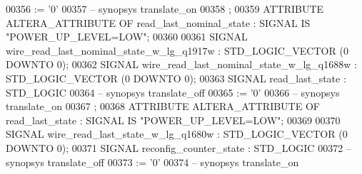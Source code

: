 \begin{DoxyCode}
{00356       \textcolor{vhdlchar}{:=} \textcolor{vhdlchar}{'}\textcolor{vhdllogic}{}\textcolor{vhdllogic}{0}\textcolor{vhdlchar}{'}
00357 \textcolor{keyword}{     -- synopsys translate\_on}
00358      ;
00359      \textcolor{keywordflow}{ATTRIBUTE} \textcolor{vhdlchar}{ALTERA_ATTRIBUTE} \textcolor{keywordflow}{OF} \textcolor{vhdlchar}{read_last_nominal_state} \textcolor{vhdlchar}{:} \textcolor{keywordflow}{SIGNAL} \textcolor{keywordflow}{IS} \textcolor{keyword}{"POWER\_UP\_LEVEL=LOW"};
00360 
00361      \textcolor{keywordflow}{SIGNAL}  \textcolor{vhdlchar}{wire_read_last_nominal_state_w_lg_q1917w}   \textcolor{vhdlchar}{:}   \textcolor{comment}{STD\_LOGIC\_VECTOR} \textcolor{vhdlchar}{(}\textcolor{vhdllogic}{}\textcolor{vhdllogic}{0} \textcolor{keywordflow}{DOWNTO} \textcolor{vhdllogic}{}\textcolor{vhdllogic}{0}\textcolor{vhdlchar}{)};
00362      \textcolor{keywordflow}{SIGNAL}  \textcolor{vhdlchar}{wire_read_last_nominal_state_w_lg_q1688w}   \textcolor{vhdlchar}{:}   \textcolor{comment}{STD\_LOGIC\_VECTOR} \textcolor{vhdlchar}{(}\textcolor{vhdllogic}{}\textcolor{vhdllogic}{0} \textcolor{keywordflow}{DOWNTO} \textcolor{vhdllogic}{}\textcolor{vhdllogic}{0}\textcolor{vhdlchar}{)};
00363      \textcolor{keywordflow}{SIGNAL}  \textcolor{vhdlchar}{read_last_state}    \textcolor{vhdlchar}{:}   \textcolor{comment}{STD\_LOGIC}
00364 \textcolor{keyword}{     -- synopsys translate\_off}
00365       \textcolor{vhdlchar}{:=} \textcolor{vhdlchar}{'}\textcolor{vhdllogic}{}\textcolor{vhdllogic}{0}\textcolor{vhdlchar}{'}
00366 \textcolor{keyword}{     -- synopsys translate\_on}
00367      ;
00368      \textcolor{keywordflow}{ATTRIBUTE} \textcolor{vhdlchar}{ALTERA_ATTRIBUTE} \textcolor{keywordflow}{OF} \textcolor{vhdlchar}{read_last_state} \textcolor{vhdlchar}{:} \textcolor{keywordflow}{SIGNAL} \textcolor{keywordflow}{IS} \textcolor{keyword}{"POWER\_UP\_LEVEL=LOW"};
00369 
00370      \textcolor{keywordflow}{SIGNAL}  \textcolor{vhdlchar}{wire_read_last_state_w_lg_q1680w}   \textcolor{vhdlchar}{:}   \textcolor{comment}{STD\_LOGIC\_VECTOR} \textcolor{vhdlchar}{(}\textcolor{vhdllogic}{}\textcolor{vhdllogic}{0} \textcolor{keywordflow}{DOWNTO} \textcolor{vhdllogic}{}\textcolor{vhdllogic}{0}\textcolor{vhdlchar}{)};
00371      \textcolor{keywordflow}{SIGNAL}  \textcolor{vhdlchar}{reconfig_counter_state} \textcolor{vhdlchar}{:}   \textcolor{comment}{STD\_LOGIC}
00372 \textcolor{keyword}{     -- synopsys translate\_off}
00373       \textcolor{vhdlchar}{:=} \textcolor{vhdlchar}{'}\textcolor{vhdllogic}{}\textcolor{vhdllogic}{0}\textcolor{vhdlchar}{'}
00374 \textcolor{keyword}{     -- synopsys translate\_on}
}
\end{DoxyCode}
